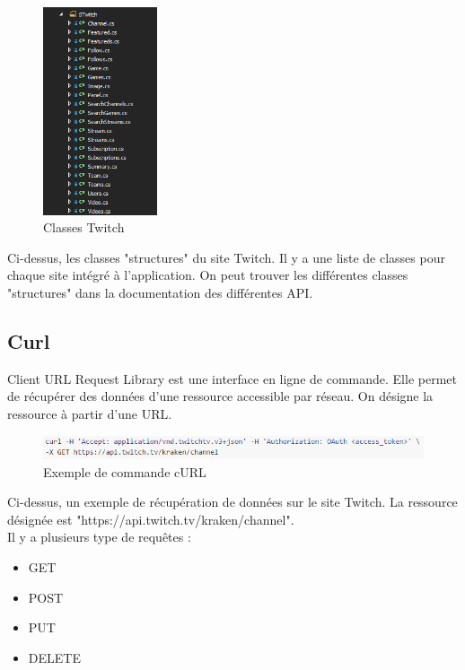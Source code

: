\documentclass[11pt]{report} %
\begin{document}
		\begin{figure}[h]
			\center
			\includegraphics[width=0.3\textwidth]{../img/STwitch.png}
			\caption{Classes Twitch}
			\label{Twitch class}
		\end{figure}
		
		Ci-dessus, les classes "structures" du site Twitch. Il y a une liste de classes pour chaque site intégré à l'application. On peut trouver les différentes classes "structures" dans la documentation des différentes API.
		
		\subsection{Curl}
		Client URL Request Library est une interface en ligne de commande. Elle permet de récupérer des données d'une ressource accessible par réseau. On désigne la ressource à partir d'une URL.
		
		\begin{figure}[h]
			\center
			\includegraphics[width=1\textwidth]{../img/curl.png}
			\caption{Exemple de commande cURL}
			\label{cURL command}
		\end{figure}
		
		Ci-dessus, un exemple de récupération de données sur le site Twitch. La ressource désignée est "https://api.twitch.tv/kraken/channel".\\
		
		Il y a plusieurs type de requêtes :
		\begin{itemize}
			\item GET
			\item POST
			\item PUT
			\item DELETE
		\end{itemize}
		
\end{document}
